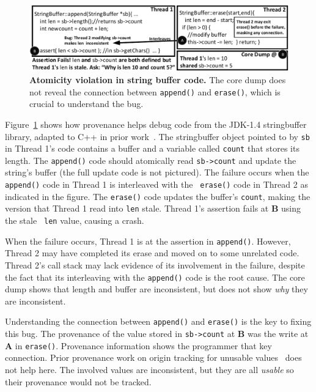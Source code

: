\documentclass[pageno,nohyperref]{jpaper}
\newcommand{\Caption}[1]{\begin{minipage}{.95\columnwidth} \caption{#1} \end{minipage} \vspace{-1.2ex}}
\begin{document}
\begin{figure}[h]
\centering
\includegraphics[width=\columnwidth]{figs/JDKStringBufferFail.pdf}
\Caption{\label{fig:coreDumpFail}{\bf Atomicity violation in string buffer code.} The core dump does not reveal the connection between {\tt append()} and {\tt erase()}, which is crucial to understand the bug.}
\end{figure}

Figure~\ref{fig:coreDumpFail} shows how provenance helps debug code from the
JDK-1.4 stringbuffer library, adapted to C++ in prior
work~\cite{concurrencybugs}.  The stringbuffer object pointed to by {\tt sb} in
Thread 1's code contains a buffer and a variable called {\tt count} that stores
its length.  The {\tt append()} code should atomically read {\tt sb->count} and
update the string's buffer (the full update code is not pictured).  The failure
occurs when the {\tt append()} code in Thread 1 is interleaved with the {\tt
erase()} code in Thread 2 as indicated in the figure.  The {\tt erase()} code
updates the buffer's {\tt count}, making the version that Thread 1 read into
{\tt len} stale.  Thread 1's assertion fails at {\bf B} using the stale {\tt
len} value, causing a crash.  

When the failure occurs, Thread 1 is at the assertion in {\tt append()}.
However, Thread 2 may have completed its erase and moved on to some unrelated
code.  Thread 2's call stack may lack evidence of its involvement in the
failure, despite the fact that its interleaving with the {\tt append()} code is
the root cause.  The core dump shows that length and buffer are inconsistent,
but does not show {\em why} they are inconsistent.  

Understanding the connection between {\tt append()} and {\tt erase()} is the
key to fixing this bug.  The provenance of the value stored in {\tt sb->count}
at {\bf B} was the write at {\bf A} in {\tt erase()}.  Provenance information
shows the programmer that key connection.  Prior provenance work on origin
tracking for unusable values~\cite{badapples} does not help here.  The involved
values are inconsistent, but they are all {\em usable} so their provenance
would not be tracked.   
\end{document}
